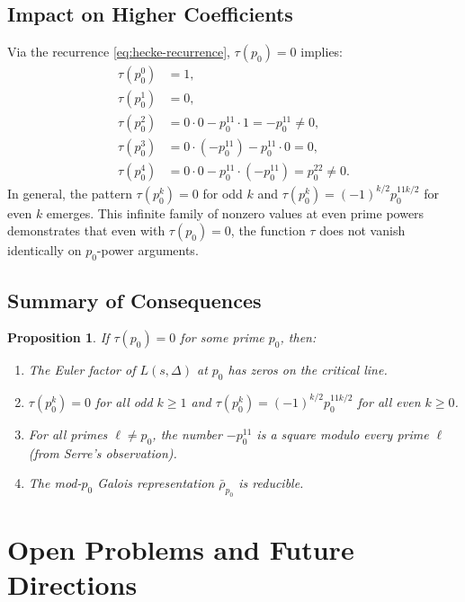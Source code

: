 \documentclass[12pt,a4paper]{amsart}
\newtheorem{proposition}[theorem]{Proposition}
\theoremstyle{definition}
\begin{document}
\subsection{Impact on Higher Coefficients}

Via the recurrence \eqref{eq:hecke-recurrence}, $\tau(p_0) = 0$ implies:
\begin{align*}
  \tau(p_0^0) &= 1, \\
  \tau(p_0^1) &= 0, \\
  \tau(p_0^2) &= 0 \cdot 0 - p_0^{11} \cdot 1 = -p_0^{11} \neq 0, \\
  \tau(p_0^3) &= 0 \cdot (-p_0^{11}) - p_0^{11} \cdot 0 = 0, \\
  \tau(p_0^4) &= 0 \cdot 0 - p_0^{11} \cdot (-p_0^{11}) = p_0^{22} \neq 0.
\end{align*}
In general, the pattern $\tau(p_0^k) = 0$ for odd $k$ and
$\tau(p_0^k) = (-1)^{k/2} p_0^{11k/2}$ for even $k$ emerges. This infinite family of
nonzero values at even prime powers demonstrates that even with $\tau(p_0) = 0$,
the function $\tau$ does not vanish identically on $p_0$-power arguments.

\subsection{Summary of Consequences}

\begin{proposition}\label{prop:consequences}
  If $\tau(p_0) = 0$ for some prime $p_0$, then:
  \begin{enumerate}[label=(\roman*)]
    \item The Euler factor of $L(s,\Delta)$ at $p_0$ has zeros on the critical line.
    \item $\tau(p_0^k) = 0$ for all \emph{odd} $k \geq 1$ and
          $\tau(p_0^k) = (-1)^{k/2} p_0^{11k/2}$ for all even $k \geq 0$.
    \item For all primes $\ell \neq p_0$, the number $-p_0^{11}$ is a square
          modulo every prime $\ell$ (from Serre's observation).
    \item The mod-$p_0$ Galois representation $\bar\rho_{p_0}$ is reducible.
  \end{enumerate}
\end{proposition}

\section{Open Problems and Future Directions}
\end{document}
